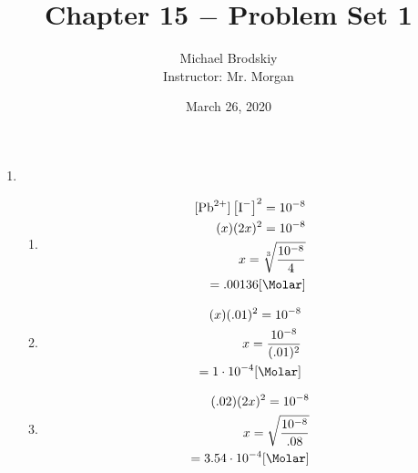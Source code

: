 \documentclass[12pt]{article}
\title{Chapter 15 $-$ Problem Set 1}
\date{March 26, 2020}
\author{Michael Brodskiy\\ \small Instructor: Mr. Morgan}
\begin{document}
\maketitle

\begin{enumerate}

  \item {}

    \begin{enumerate}

      \item 

        \begin{equation}
          \begin{split}
            [\ce{Pb^2+}]\left[ \ce{I-}  \right]^2=10^{-8}\\
            (x)(2x)^2=10^{-8}\\
            x=\sqrt[3]{\frac{10^{-8}}{4}}\\
            =.00136[\si{\Molar}]\\
          \end{split}
          \label{1}
        \end{equation}

      \item 

        \begin{equation}
          \begin{split}
            (x)(.01)^2=10^{-8}\\
            x=\frac{10^{-8}}{(.01)^2}\\
            =1\cdot10^{-4}[\si{\Molar}]\\
          \end{split}
          \label{2}
        \end{equation}

      \item 

        \begin{equation}
          \begin{split}
            (.02)(2x)^2=10^{-8}\\
            x=\sqrt{\frac{10^{-8}}{.08}}\\
            =3.54\cdot10^{-4}[\si{\Molar}]
          \end{split}
          \label{3}
        \end{equation}

    \end{enumerate}


\end{enumerate}
\end{document}

